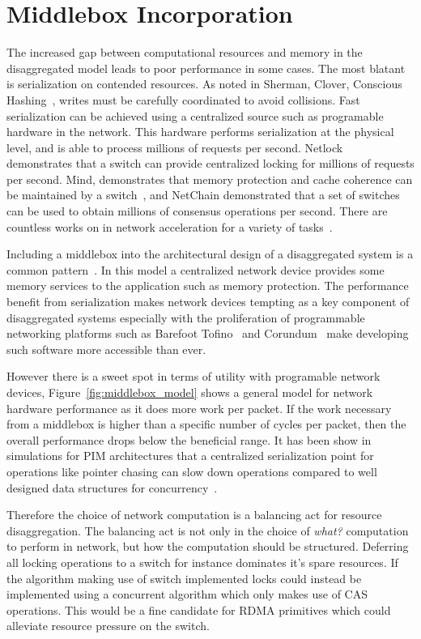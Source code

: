 \section{Middlebox Incorporation}

The increased gap between computational resources and memory in the
disaggregated model leads to poor performance in some cases. The most blatant is
serialization on contended resources. As noted in Sherman, Clover, Conscious
Hashing~\cite{sherman,clover,one-sided-hash}, writes must be carefully
coordinated to avoid collisions. Fast serialization can be achieved using a
centralized source such as programable hardware in the network. This hardware
performs serialization at the physical level, and is able to process millions of
requests per second. Netlock~\cite{netlock} demonstrates that a switch can
provide centralized locking for millions of requests per second. Mind,
demonstrates that memory protection and cache coherence can be maintained by a
switch~\cite{mind}, and NetChain demonstrated that a set of switches can be used
to obtain millions of consensus operations per second. There are countless works
on in network acceleration for a variety of tasks~.

Including a middlebox into the architectural design of a disaggregated system is
a common pattern~\cite{disandapp}. In this model a centralized network device
provides some memory services to the application such as memory protection. The
performance benefit from serialization makes network devices tempting as a key
component of disaggregated systems especially with the proliferation of
programmable networking platforms such as Barefoot Tofino~\cite{tofino3} and
Corundum~\cite{corundum} make developing such software more accessible than ever.

However there is a sweet spot in terms of utility with programable network
devices, Figure~\ref{fig:middlebox_model} shows a general model for network hardware
performance as it does more work per packet. If the work necessary from a
middlebox is higher than a specific number of cycles per packet, then the
overall performance drops below the beneficial range. It has been show in
simulations for PIM architectures that a centralized serialization point for
operations like pointer chasing can slow down operations compared to well
designed data structures for concurrency~.

Therefore the choice of network computation is a balancing act for resource
disaggregation. The balancing act is not only in the choice of \textit{what?}
computation to perform in network, but how the computation should be structured.
Deferring all locking operations to a switch for instance dominates it's spare
resources. If the algorithm making use of switch implemented locks could instead
be implemented using a concurrent algorithm which only makes use of CAS
operations. This would be a fine candidate for RDMA primitives which could
alleviate resource pressure on the switch.

